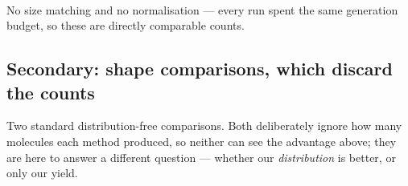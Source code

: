 \documentclass[11pt]{article}
\begin{document}
\begin{table}[htbp]
\centering
\footnotesize
\setlength{\tabcolsep}{4pt}
\\[0.4em] \begin{minipage}{0.92\textwidth}\footnotesize No size matching and no normalisation --- every run spent the same generation budget, so these are directly comparable counts.\end{minipage}
\caption{Novel molecules clearing each QED bar, out of the 1{,}024 sequences each run generated. The two mixture-sampling modes are kept apart rather than merged into a single \emph{ours} row, since they are different samplers. Each is at its own best setting, ranked on the middle bar; the multiplier is against D-CBG on the same model.}
\label{tab:hits-qed}
\end{table}


\subsection{Secondary: shape comparisons, which discard the counts}

Two standard distribution-free comparisons. Both deliberately ignore how many
molecules each method produced, so neither can see the advantage above; they are
here to answer a different question --- whether our \emph{distribution} is
better, or only our yield.
\end{document}
